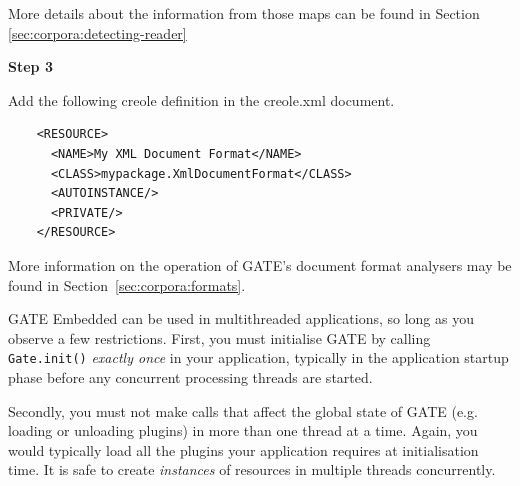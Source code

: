 More details about the information from those maps can be found in
Section \ref{sec:corpora:detecting-reader}

 {\bf Step 3}

Add the following creole definition in the creole.xml document.
\small
\begin{verbatim}
    <RESOURCE>
      <NAME>My XML Document Format</NAME>
      <CLASS>mypackage.XmlDocumentFormat</CLASS>
      <AUTOINSTANCE/>
      <PRIVATE/>
    </RESOURCE>
\end{verbatim}
\nnormalsize

More information on the operation of GATE's document format analysers may be
found in Section~\ref{sec:corpora:formats}.



GATE Embedded can be used in multithreaded applications, so long as
you observe a few restrictions.  First, you must initialise GATE by
calling \texttt{Gate.init()} {\em exactly once} in your application,
typically in the application startup phase before any concurrent
processing threads are started.

Secondly, you must not make calls that affect the global state of GATE (e.g.
loading or unloading plugins) in more than one thread at a time.  Again, you
would typically load all the plugins your application requires at
initialisation time.  It is safe to create {\em instances} of resources in
multiple threads concurrently.

